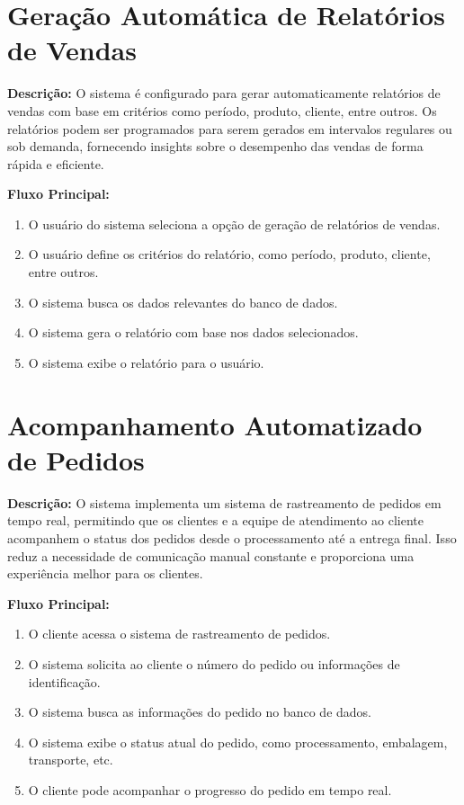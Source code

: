 \documentclass[
	12pt,				%
	openright,			%
	twoside,			%
	a4paper,			%
	english,			%
	brazil				%
	]{abntex2}
\begin{document}
\section*{ Geração Automática de Relatórios de Vendas}

\textbf{Descrição:} O sistema é configurado para gerar automaticamente relatórios de vendas com base em critérios como período, produto, cliente, entre outros. Os relatórios podem ser programados para serem gerados em intervalos regulares ou sob demanda, fornecendo insights sobre o desempenho das vendas de forma rápida e eficiente.

\textbf{Fluxo Principal:}
\begin{enumerate}
  \item O usuário do sistema seleciona a opção de geração de relatórios de vendas.
  \item O usuário define os critérios do relatório, como período, produto, cliente, entre outros.
  \item O sistema busca os dados relevantes do banco de dados.
  \item O sistema gera o relatório com base nos dados selecionados.
  \item O sistema exibe o relatório para o usuário.
\end{enumerate}


\section*{ Acompanhamento Automatizado de Pedidos}

\textbf{Descrição:} O sistema implementa um sistema de rastreamento de pedidos em tempo real, permitindo que os clientes e a equipe de atendimento ao cliente acompanhem o status dos pedidos desde o processamento até a entrega final. Isso reduz a necessidade de comunicação manual constante e proporciona uma experiência melhor para os clientes.

\textbf{Fluxo Principal:}
\begin{enumerate}
  \item O cliente acessa o sistema de rastreamento de pedidos.
  \item O sistema solicita ao cliente o número do pedido ou informações de identificação.
  \item O sistema busca as informações do pedido no banco de dados.
  \item O sistema exibe o status atual do pedido, como processamento, embalagem, transporte, etc.
  \item O cliente pode acompanhar o progresso do pedido em tempo real.
\end{enumerate}
\end{document}
